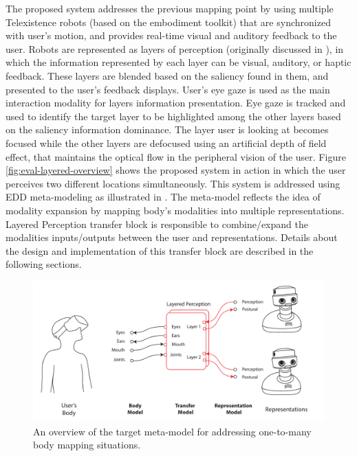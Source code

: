 The proposed system addresses the previous mapping point by using multiple Telexistence robots (based on the embodiment toolkit) that are synchronized with user’s motion, and provides real-time visual and auditory feedback to the user. Robots are represented as layers of perception (originally discussed in ), in which the information represented by each layer can be visual, auditory, or haptic feedback. These layers are blended based on the saliency found in them, and presented to the user’s feedback displays. User’s eye gaze is used as the main interaction modality for layers information presentation. Eye gaze is tracked and used to identify the target layer to be highlighted among the other layers based on the saliency information dominance. The layer user is looking at becomes focused while the other layers are defocused using an artificial depth of field effect, that maintains the optical flow in the peripheral vision of the user. Figure \ref{fig:eval-layered-overview} shows the proposed system in action in which the user perceives two different locations simultaneously. This system is addressed using EDD meta-modeling as illustrated in . The meta-model reflects the idea of modality expansion by mapping body's modalities into multiple representations. Layered Perception transfer block is responsible to combine/expand the modalities inputs/outputs between the user and representations. Details about the design and implementation of this transfer block are described in the following sections.

\begin{figure}[h!]
  \centering
  \includegraphics[width=0.95\linewidth]{figures/eval/EDD/EDD-LP.pdf}
  \captionsetup{justification=centering}
  \caption{An overview of the target meta-model for addressing one-to-many body mapping situations.}
  \label{fig:eval-EDD-LP}
\end{figure}

